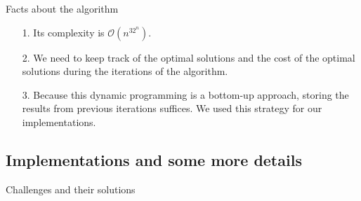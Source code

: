 \documentclass[11pt]{beamer}
\begin{document}
    \begin{frame}{Facts about the algorithm}
        \begin{itemize}
            \item [1.] Its complexity is $\mathcal{O}(n^32^n)$. 
            \item [2.] We need to keep track of the optimal solutions and the cost of the optimal solutions during the iterations of the algorithm. 
            \item [3.] Because this dynamic programming is a bottom-up approach, storing the results from previous iterations suffices. We used this strategy for our implementations. 
        \end{itemize}
    \end{frame}
\subsection{Implementations and some more details}
    \begin{frame}{Challenges and their solutions}
        
        
    \end{frame}
\end{document}
